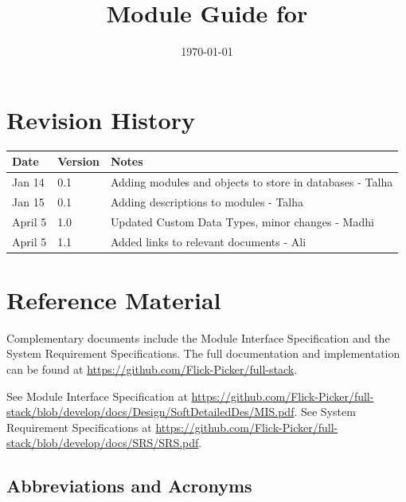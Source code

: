 \documentclass[12pt, titlepage]{article}
\begin{document}
\title{Module Guide for \progname{}} 
\author{\authname}
\date{\today}

\maketitle


\section{Revision History}

\begin{tabularx}{\textwidth}{p{3cm}p{2cm}X}
\toprule {\bf Date} & {\bf Version} & {\bf Notes}\\
\midrule
Jan 14 & 0.1 & Adding modules and objects to store in databases - Talha\\
Jan 15 & 0.1 & Adding descriptions to modules - Talha\\
April 5 & 1.0 & Updated Custom Data Types, minor changes - Madhi \\
April 5 & 1.1 & Added links to relevant documents - Ali \\
\bottomrule
\end{tabularx}

\newpage

\section{Reference Material}

Complementary documents include the Module Interface Specification and the System Requirement Specifications.
The full documentation and implementation can be
found at \url{https://github.com/Flick-Picker/full-stack}.

See Module Interface Specification at \url{https://github.com/Flick-Picker/full-stack/blob/develop/docs/Design/SoftDetailedDes/MIS.pdf}.
See System Requirement Specifications at \url{https://github.com/Flick-Picker/full-stack/blob/develop/docs/SRS/SRS.pdf}.

\subsection{Abbreviations and Acronyms}
\end{document}
